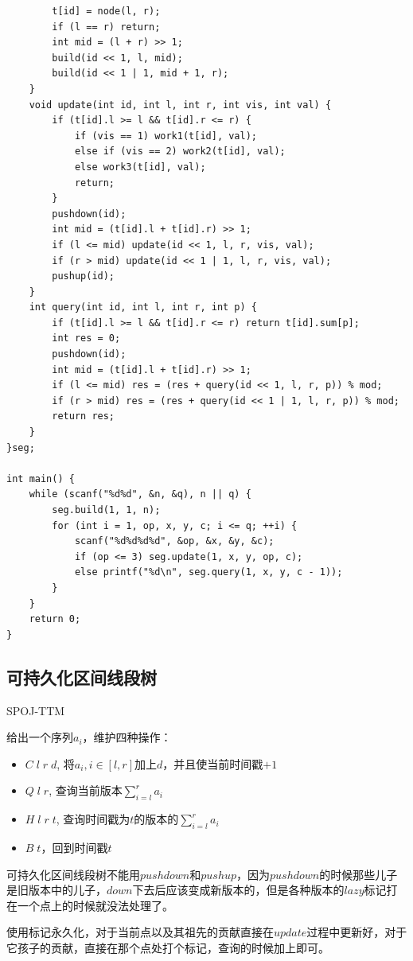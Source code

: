 \begin{lstlisting}
		t[id] = node(l, r);
		if (l == r) return;
		int mid = (l + r) >> 1;
		build(id << 1, l, mid);
		build(id << 1 | 1, mid + 1, r);
	}
	void update(int id, int l, int r, int vis, int val) {
		if (t[id].l >= l && t[id].r <= r) {
			if (vis == 1) work1(t[id], val); 
			else if (vis == 2) work2(t[id], val);
			else work3(t[id], val);   
			return;  
		}
		pushdown(id); 
		int mid = (t[id].l + t[id].r) >> 1;
		if (l <= mid) update(id << 1, l, r, vis, val);
		if (r > mid) update(id << 1 | 1, l, r, vis, val);  
		pushup(id);
	}
	int query(int id, int l, int r, int p) {
		if (t[id].l >= l && t[id].r <= r) return t[id].sum[p]; 
		int res = 0;
		pushdown(id); 
		int mid = (t[id].l + t[id].r) >> 1;
		if (l <= mid) res = (res + query(id << 1, l, r, p)) % mod; 
		if (r > mid) res = (res + query(id << 1 | 1, l, r, p)) % mod; 
		return res;
	}
}seg;

int main() {
	while (scanf("%d%d", &n, &q), n || q) {
		seg.build(1, 1, n);
		for (int i = 1, op, x, y, c; i <= q; ++i) {
			scanf("%d%d%d%d", &op, &x, &y, &c);
			if (op <= 3) seg.update(1, x, y, op, c); 
			else printf("%d\n", seg.query(1, x, y, c - 1));
		}
	}
	return 0;
}
\end{lstlisting}

\subsection{可持久化区间线段树}
SPOJ-TTM\par
给出一个序列$a_i$，维护四种操作：\par
\begin{itemize}
\item $C\;l\;r\;d$, 将$a_i, i \in [l, r]$加上$d$，并且使当前时间戳$+1$
\item $Q\;l\;r$, 查询当前版本$\sum\limits_{i = l}^r a_i$
\item $H\;l\;r\;t$, 查询时间戳为$t$的版本的$\sum\limits_{i = l}^r a_i$
\item $B\;t$，回到时间戳$t$
\end{itemize}

可持久化区间线段树不能用$pushdown$和$pushup$，因为$pushdown$的时候那些儿子是旧版本中的儿子，$down$下去后应该变成新版本的，但是各种版本的$lazy$标记打在一个点上的时候就没法处理了。\par
使用标记永久化，对于当前点以及其祖先的贡献直接在$update$过程中更新好，对于它孩子的贡献，直接在那个点处打个标记，查询的时候加上即可。\par

